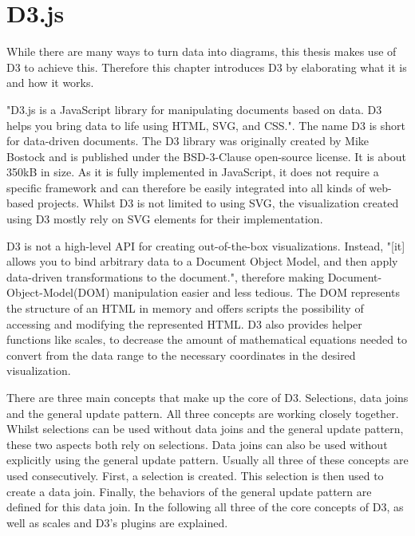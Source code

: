 \section{D3.js}

While there are many ways to turn data into diagrams, this thesis makes use of D3 to achieve this. Therefore this chapter introduces D3 by elaborating what it is and how it works.

"D3.js is a JavaScript library for manipulating documents based on data. D3 helps you bring data to life using HTML, SVG, and CSS."\cite{d3js}. The name D3 is short for data-driven documents. The D3 library was originally created by Mike Bostock and is published under the BSD-3-Clause open-source license. It is about 350kB in size. As it is fully implemented in JavaScript, it does not require a specific framework and can therefore be easily integrated into all kinds of web-based projects. Whilst D3 is not limited to using SVG, the visualization created using D3 mostly rely on SVG elements for their implementation.

D3 is not a high-level API for creating out-of-the-box visualizations. Instead, "[it] allows you to bind arbitrary data to a Document Object Model, and then apply data-driven transformations to the document."\cite{d3js}, therefore making Document-Object-Model(DOM) manipulation easier and less tedious. The DOM represents the structure of an HTML in memory and offers scripts the possibility of accessing and modifying the represented HTML. D3 also provides helper functions like scales, to decrease the amount of mathematical equations needed to convert from the data range to the necessary coordinates in the desired visualization.

There are three main concepts that make up the core of D3. Selections, data joins and the general update pattern. All three concepts are working closely together. Whilst selections can be used without data joins and the general update pattern, these two aspects both rely on selections. Data joins can also be used without explicitly using the general update pattern. Usually all three of these concepts are used consecutively. First, a selection is created. This selection is then used to create a data join. Finally, the behaviors of the general update pattern are defined for this data join.
In the following all three of the core concepts of D3, as well as scales and D3's plugins are explained.


